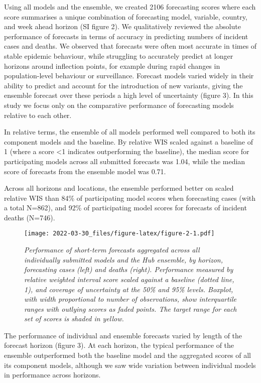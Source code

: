 \documentclass[
]{article}
\begin{document}
Using all models and the ensemble, we created 2106 forecasting scores
where each score summarises a unique combination of forecasting model,
variable, country, and week ahead horizon (SI figure 2). We
qualitatively reviewed the absolute performance of forecasts in terms of
accuracy in predicting numbers of incident cases and deaths. We observed
that forecasts were often most accurate in times of stable epidemic
behaviour, while struggling to accurately predict at longer horizons
around inflection points, for example during rapid changes in
population-level behaviour or surveillance. Forecast models varied
widely in their ability to predict and account for the introduction of
new variants, giving the ensemble forecast over these periods a high
level of uncertainty (figure 3). In this study we focus only on the
comparative performance of forecasting models relative to each other.

In relative terms, the ensemble of all models performed well compared to
both its component models and the baseline. By relative WIS scaled
against a baseline of 1 (where a score \textless1 indicates
outperforming the baseline), the median score for participating models
across all submitted forecasts was 1.04, while the median score of
forecasts from the ensemble model was 0.71.

Across all horizons and locations, the ensemble performed better on
scaled relative WIS than 84\% of participating model scores when
forecasting cases (with a total N=862), and 92\% of participating model
scores for forecasts of incident deaths (N=746).

\begin{figure}
\centering
\texttt{[image: 2022-03-30\_files/figure-latex/figure-2-1.pdf]}
\caption{\emph{Performance of short-term forecasts aggregated across all
individually submitted models and the Hub ensemble, by horizon,
forecasting cases (left) and deaths (right). Performance measured by
relative weighted interval score scaled against a baseline (dotted line,
1), and coverage of uncertainty at the 50\% and 95\% levels. Boxplot,
with width proportional to number of observations, show interquartile
ranges with outlying scores as faded points. The target range for each
set of scores is shaded in yellow.}}
\end{figure}

The performance of individual and ensemble forecasts varied by length of
the forecast horizon (figure 3). At each horizon, the typical
performance of the ensemble outperformed both the baseline model and the
aggregated scores of all its component models, although we saw wide
variation between individual models in performance across horizons.
\end{document}
